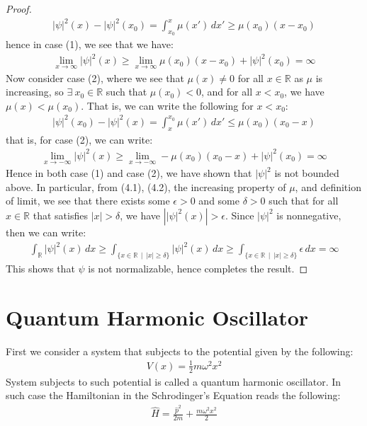 \documentclass[11pt]{book}
\theoremstyle{break}
\theoremstyle{break}
\newcommand{\R}{\mathbb{R}}
\begin{document}
\begin{proof}
\begin{align*}
|\psi|^2(x) - |\psi|^2(x_0) =\int_{x_0}^x \mu(x') \, dx' \geq \mu(x_0)(x-x_0)
\end{align*}
hence in case (1), we see that we have:
\begin{align}
\lim_{x\to \infty}|\psi|^2 (x) \geq \lim_{x\to \infty}\mu(x_0)(x-x_0)+|\psi|^2(x_0) = \infty
\end{align}
Now consider case (2), where we see that $\mu(x)\neq 0$ for all $x\in \R$ as $\mu$ is increasing, so $\exists\ x_0 \in \R$ such that $\mu(x_0)<0$, and for all $x< x_0$, we have $\mu(x) < \mu(x_0)$. That is, we can write the following for $x<x_0$:
\begin{align*}
|\psi|^2(x_0) - |\psi|^2(x) = \int_{x}^{x_0} \mu(x') \, dx' \leq \mu(x_0)(x_0-x)  
\end{align*}
that is, for case (2), we can write:
\begin{align}
\lim_{x\to -\infty}|\psi|^2(x) \geq \lim_{x\to -\infty}-\mu(x_0)(x_0-x)+|\psi|^2(x_0) = \infty
\end{align}
Hence in both case (1) and case (2), we have shown that $|\psi|^2$ is not bounded above. In particular, from (4.1), (4.2), the increasing property of $\mu$, and definition of limit, we see that there exists some $\epsilon>0$ and some $\delta >0$ such that for all $x \in \R$ that satisfies $|x|>\delta$, we have $\left| |\psi|^2(x)\right| > \epsilon$. Since $|\psi|^2$ is nonnegative, then we can write:
\begin{align*}
\int_\R |\psi|^2 (x) \, dx\geq \int_{\{x\in \R\,\mid\,|x|\geq \delta\}}|\psi|^2 (x) \, dx \geq \int_{\{x\in \R\,\mid\,|x|\geq \delta\}} \epsilon \, dx = \infty
\end{align*}
This shows that $\psi$ is not normalizable, hence completes the result. 
\end{proof}


\newpage
\section[Quantum Harmonic Oscillator]{\color{red}Quantum Harmonic Oscillator\color{black}}
First we consider a system that subjects to the potential given by the following:
\begin{align*}
V(x) = \frac{1}{2}m\omega^2 x^2
\end{align*}
System subjects to such potential is called a quantum harmonic oscillator. In such case the Hamiltonian in the Schrodinger's Equation reads the following:
\begin{align*}
\hat{H} = \frac{\hat{p}^2}{2m}+\frac{m\omega^2 x^2}{2}
\end{align*}
\end{document}
